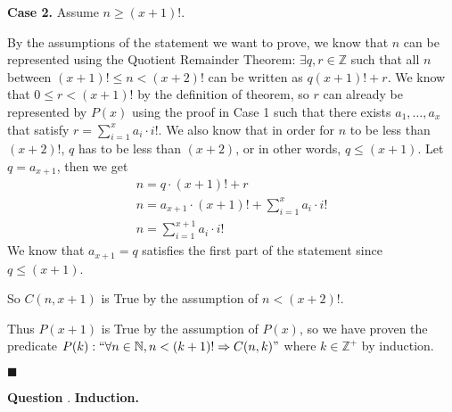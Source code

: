 \documentclass{article}
\newcounter{qcount}
\newcommand\q{\stepcounter{qcount} \textbf{Question \theqcount}. }
\newcommand\qedsymbol{\hfill$\blacksquare$}
\begin{document}
\textbf{Case 2.} Assume $n \geq (x + 1)!$.

By the assumptions of the statement we want to prove, 
we know that $n$ can be represented using the Quotient Remainder Theorem: 
$\exists q, r \in \mathbb{Z}$ such that all $n$ between $(x+1)! \leq n < 
(x+2)!$ can be written as $q (x+1)! + r$. We know that $0 \leq r < (x+1)!$ by the 
definition of theorem, so $r$ can already be represented by $P(x)$ using 
the proof in Case 1 such that there exists $a_1, \ldots, a_x$ that satisfy 
$r = \sum_{i=1}^{x} a_i \cdot i!$.
\newpage
We also know that in order for $n$ to be less than $(x+2)!$, 
$q$ has to be less than $(x+2)$, or in other words, $q \leq (x+1)$. Let 
$q = a_ {x+1}$, then we get 
\begin{align*}
    n = q \cdot (x+1)! + r \\
    n = a_ {x+1}\cdot (x+1)! + \sum_{i=1}^{x} a_i \cdot i!\\
    n = \sum_{i=1}^{x+1} a_i \cdot i! 
\end{align*}
We know that $a_ {x+1} = q$ satisfies the first part of the statement 
since $q \leq (x+1)$. 

So $C (n , x+1)$ is True
by the assumption of $n < (x+2)!$. 

Thus $P(x+1)$ is True
by the assumption of $P(x)$, so we have proven the predicate $P(k): 
`` \forall n \in \mathbb{N}, n < (k+1)! \Rightarrow C (n, k)"$ where 
$k \in \mathbb{Z}^+$ by induction. 

\qedsymbol

\newpage
\q \textbf{Induction.}
\end{document}
